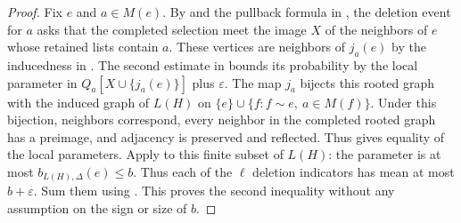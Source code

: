 \begin{proof}
Fix $e$ and $a\in M(e)$. By  and the pullback
formula in , the deletion event for $a$ asks that the completed
selection meet the image $X$ of the neighbors of $e$ whose retained lists
contain $a$. These vertices are neighbors of $j_a(e)$ by the inducedness
in .
The second estimate in  bounds its
probability by the local parameter in $Q_a[X\cup\{j_a(e)\}]$ plus
$\varepsilon$. The map $j_a$ bijects this rooted graph with the induced
graph of $L(H)$ on $\{e\}\cup\{f:f\sim e,\ a\in M(f)\}$.
Under this bijection, neighbors correspond, every neighbor in the completed
rooted graph has a preimage, and adjacency is preserved and reflected.
Thus  gives equality
of the local parameters. Apply 
to this finite subset of $L(H)$: the parameter is at most
$b_{L(H),\Delta}(e)\le b$. Thus each of the $\ell$ deletion indicators
has mean at most $b+\varepsilon$. Sum them using
. This proves the second inequality without
any assumption on the sign or size of $b$.
\end{proof}

